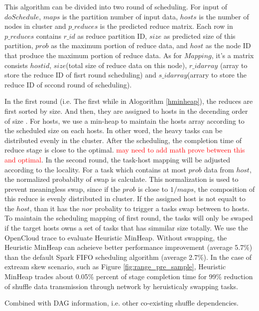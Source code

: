 \documentclass[10pt,twocolumn]{article}
\begin{document}
This algorithm can be divided into two round of scheduling. For input of $doSchedule$, $maps$ is the partition number of input data, $hosts$ is the number of nodes in cluster and $p\_reduces$ is the predicted reduce matrix. Each row in $p\_reduces$ contains $r\_id$ as reduce partition ID, $size$ as predicted size of this partition, $prob$ as the maximum portion of reduce data, and $host$ as the node ID that produce the maximum portion of reduce data. As for $Mapping$, it's a matrix consists $hostid$, $size$(total size of reduce data on this node), $r\_id array$ (array to store the reduce ID of fisrt round scheduling) and $s\_id array$(arrary to store the reduce ID of sccond round of scheduling). 

In the first round (i.e. The first while in Alogorithm \ref{hminheap}), the reduces are first sorted by size. And then, they are assigned to hosts in the decending order of size . For hosts, we use a min-heap to maintain the hosts array according to the scheduled size on each hosts. In other word, the heavy tasks can be distributed evenly in the cluster.  After the scheduling, the completion time of reduce stage is close to the optimal. \textcolor{red}{may need to add math prove between this and optimal}. In the second round, the task-host mapping will be adjusted according to the locality. For a task which contains at most $prob$ data from $host$, the normalized probabilty of swap is calculate. This normalization is used to prevent meaningless swap, since if the $prob$ is close to $1/maps$, the composition of this reduce is evenly distributed in cluster. If the assigned host is not equalt to the $host$, than it has the $nor$ probality to trigger a tasks swap between to hosts. To maintain the scheduling mapping of first round, the tasks will only be swaped if the target hosts owns a set of tasks that has simmilar size totally. We use the OpenCloud\cite{opencloudtrace} trace to evaluate Heuristic MinHeap. Without swapping, the Heuristic MinHeap can acheieve better performance improvement (average 5.7\%) than the default Spark FIFO scheduling algorithm (average 2.7\%). In the case of extream skew scenario, such as Figure \ref{fig:range_pre_sample}, Heuristic MinHeap trades about 0.05\% percent of stage completion time for 99\% reduction of shuffle data transmission through network by heruisticaly swapping tasks.

Combined with DAG information, i.e. other co-existing shuffle dependencies.
\end{document}
